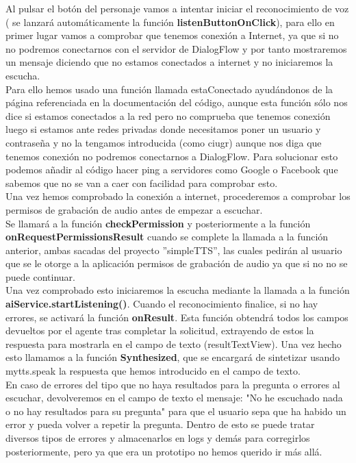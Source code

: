 Al pulsar el botón del personaje vamos a intentar iniciar el reconocimiento de voz ( se lanzará automáticamente la función \textbf{listenButtonOnClick}), para ello en primer lugar vamos a comprobar que tenemos conexión a Internet, ya que si no no podremos conectarnos con el servidor de DialogFlow y por tanto mostraremos un mensaje diciendo que no estamos conectados a internet y no iniciaremos la escucha. \\ 

Para ello hemos usado una función llamada estaConectado ayudándonos de la página referenciada en la documentación del código, aunque esta función sólo nos dice si estamos conectados a la red pero no comprueba que tenemos conexión luego si estamos ante redes privadas donde necesitamos poner un usuario y contraseña y no la tengamos introducida (como ciugr) aunque nos diga que tenemos conexión no podremos conectarnos a DialogFlow. Para solucionar esto podemos añadir al código hacer ping a servidores como Google o Facebook que sabemos que no se van a caer con facilidad para comprobar esto. \\

Una vez hemos comprobado la conexión a internet, procederemos a comprobar los permisos de grabación de audio antes de empezar a escuchar. \\

Se llamará a la función \textbf{checkPermission} y posteriormente a la función \textbf{onRequestPermissionsResult} cuando se complete la llamada a la función anterior, ambas sacadas del proyecto ''simpleTTS'', las cuales pedirán al usuario que se le otorge a la aplicación permisos de grabación de audio ya que si no no se puede continuar. \\

Una vez comprobado esto iniciaremos la escucha mediante la llamada a la función \textbf{aiService.startListening()}. Cuando el reconocimiento finalice, si no hay errores, se activará la función \textbf{onResult}. Esta función obtendrá todos los campos devueltos por el agente tras completar la solicitud, extrayendo de estos la respuesta para mostrarla en el campo de texto (resultTextView). Una vez hecho esto llamamos a la función \textbf{Synthesized}, que se encargará de sintetizar usando mytts.speak la respuesta que hemos introducido en el campo de texto. \\

En caso de errores del tipo que no haya resultados para la pregunta o errores al escuchar, devolveremos en el campo de texto el mensaje: "No he escuchado nada o no hay resultados para su pregunta" para que el usuario sepa que ha habido un error y pueda volver a repetir la pregunta. Dentro de esto se puede tratar diversos tipos de errores y almacenarlos en logs y demás para corregirlos posteriormente, pero ya que era un prototipo no hemos querido ir más allá. \\ 

